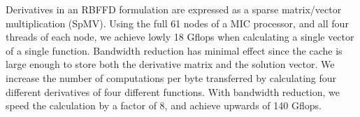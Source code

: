 \documentclass[10pt,conference,compsocconf]{IEEEtran}
\newcommand{\todo}[1]{{\color{red}\textbf{\hl{#1}}\xspace}}
\begin{document}
%
%
%
%

Derivatives in an RBFFD formulation are expressed as a sparse
matrix/vector multiplication (SpMV). Using the full 61 nodes of a MIC
processor, and all four threads of each node, we achieve lowly 18
Gflops when calculating a single vector of a single
function. Bandwidth reduction has minimal effect since the cache is
large enough to store both the derivative matrix and the solution
vector. We increase the number of computations per byte transferred by
calculating four different derivatives of four different
functions. With bandwidth reduction, we speed the calculation by a
factor of 8, and achieve upwards of 140 Gflops.
\end{document}
